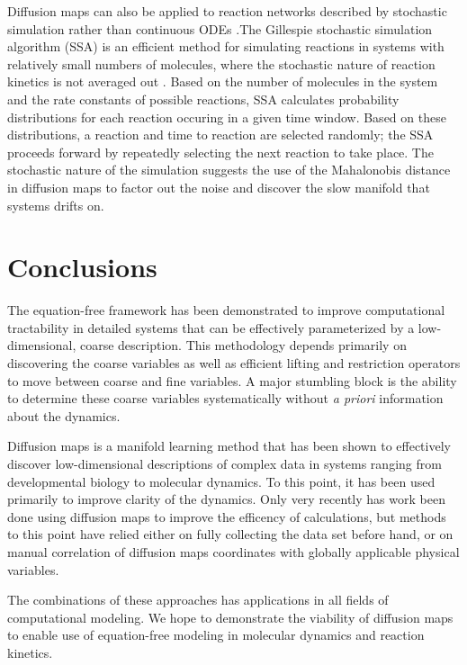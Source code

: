 \documentclass[12pt]{article}
\begin{document}
Diffusion maps can also be applied to reaction networks described by stochastic simulation rather than continuous ODEs \cite{Dsilva2013}.The Gillespie stochastic simulation algorithm (SSA) is an efficient method for simulating reactions in systems with relatively small numbers of molecules, where the stochastic nature of reaction kinetics is not averaged out \cite{Gillespie1977}. Based on the number of molecules in the system and the rate constants of possible reactions, SSA calculates probability distributions for each reaction occuring in a given time window. Based on these distributions, a reaction and time to reaction are selected randomly; the SSA proceeds forward by repeatedly selecting the next reaction to take place. The stochastic nature of the simulation suggests the use of the Mahalonobis distance in diffusion maps to factor out the noise and discover the slow manifold that systems drifts on.

\section{Conclusions}

The equation-free framework has been demonstrated to improve computational tractability in detailed systems that can be effectively parameterized by a low-dimensional, coarse description. This methodology depends primarily on discovering the coarse variables as well as efficient lifting and restriction operators to move between coarse and fine variables. A major stumbling block is the ability to determine these coarse variables systematically without \textit{a priori} information about the dynamics. \vspace{1mm}

Diffusion maps is a manifold learning method that has been shown to effectively discover low-dimensional descriptions of complex data in systems ranging from developmental biology to molecular dynamics. To this point, it has been used primarily to improve clarity of the dynamics. Only very recently has work been done using diffusion maps to improve the efficency of calculations, but methods to this point have relied either on fully collecting the data set before hand, or on manual correlation of diffusion maps coordinates with globally applicable physical variables. \vspace{1mm}

The combinations of these approaches has applications in all fields of computational modeling. We hope to demonstrate the viability of diffusion maps to enable use of equation-free modeling in molecular dynamics and reaction kinetics.



\end{document}
